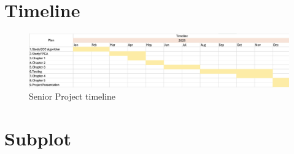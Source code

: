 \documentclass[a4paper]{report} %
\begin{document}
	\section{Timeline}
		\begin{figure}[!h]
			\noindent\Centering
			\includegraphics[width=1\textwidth]{MyTimeline}
			\caption{Senior Project timeline}
			\label{fig:Project timeline}
		\end{figure}
			
	\section{Subplot}
\end{document}
